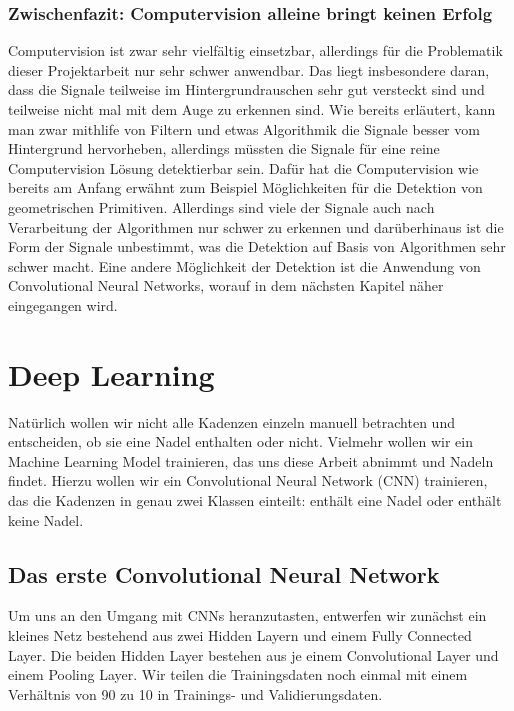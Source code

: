 \documentclass[12pt, a4paper]{article}
\begin{document}
\subsubsection{Zwischenfazit: Computervision alleine bringt keinen Erfolg}
Computervision ist zwar sehr vielfältig einsetzbar, allerdings für die Problematik dieser Projektarbeit nur sehr schwer anwendbar. Das liegt insbesondere daran, dass die Signale teilweise im Hintergrundrauschen sehr gut versteckt sind und teilweise nicht mal mit dem Auge zu erkennen sind. Wie bereits erläutert, kann man zwar mithlife von Filtern und etwas Algorithmik die Signale besser vom Hintergrund hervorheben, allerdings müssten die Signale für eine reine Computervision Lösung detektierbar sein. Dafür hat die Computervision wie bereits am Anfang erwähnt zum Beispiel Möglichkeiten für die Detektion von geometrischen Primitiven. Allerdings sind viele der Signale auch nach Verarbeitung der Algorithmen nur schwer zu erkennen und darüberhinaus ist die Form der Signale unbestimmt, was die Detektion auf Basis von Algorithmen sehr schwer macht. Eine andere Möglichkeit der Detektion ist die Anwendung von Convolutional Neural Networks, worauf in dem nächsten Kapitel näher eingegangen wird.

\section{Deep Learning}
Natürlich wollen wir nicht alle Kadenzen einzeln manuell betrachten und entscheiden, ob sie eine Nadel enthalten oder nicht. Vielmehr wollen wir ein Machine Learning Model trainieren, das uns diese Arbeit abnimmt und Nadeln findet. Hierzu wollen wir ein Convolutional Neural Network (CNN) trainieren, das die Kadenzen in genau zwei Klassen einteilt: enthält eine Nadel oder enthält keine Nadel.

\subsection{Das erste Convolutional Neural Network}
Um uns an den Umgang mit CNNs heranzutasten, entwerfen wir zunächst ein kleines Netz bestehend aus zwei Hidden Layern und einem Fully Connected Layer. Die beiden Hidden Layer bestehen aus je einem Convolutional Layer und einem Pooling Layer. Wir teilen die Trainingsdaten noch einmal mit einem Verhältnis von 90 zu 10 in Trainings- und Validierungsdaten. 
\end{document}
